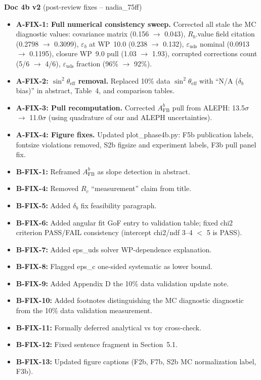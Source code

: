 \documentclass[11pt,a4paper]{article}
\begin{document}
\textbf{Doc 4b v2} (post-review fixes -- nadia\_75ff)
\begin{itemize}
\item \textbf{A-FIX-1: Full numerical consistency sweep.} Corrected all stale the MC diagnostic
  values: covariance matrix (0.156 $\to$ 0.043), $R_b$.value field citation (0.2798 $\to$ 0.3099),
  $\varepsilon_b$ at WP~10.0 (0.238 $\to$ 0.132), $\varepsilon_\mathrm{uds}$ nominal
  (0.0913 $\to$ 0.1195), closure WP~9.0 pull (1.03 $\to$ 1.93), corrupted corrections
  count (5/6 $\to$ 4/6), $\varepsilon_\mathrm{uds}$ fraction (96\% $\to$ 92\%).
\item \textbf{A-FIX-2: $\sin^2\theta_\mathrm{eff}$ removal.} Replaced 10\% data
  $\sin^2\theta_\mathrm{eff}$ with ``N/A ($\delta_b$ bias)'' in abstract, Table~4,
  and comparison tables.
\item \textbf{A-FIX-3: Pull recomputation.} Corrected $A_\mathrm{FB}^b$ pull from ALEPH:
  13.5$\sigma$ $\to$ 11.0$\sigma$ (using quadrature of our and ALEPH uncertainties).
\item \textbf{A-FIX-4: Figure fixes.} Updated plot\_phase4b.py: F5b publication labels,
  fontsize violations removed, S2b figsize and experiment labels, F3b pull panel fix.
\item \textbf{B-FIX-1:} Reframed $A_\mathrm{FB}^b$ as slope detection in abstract.
\item \textbf{B-FIX-4:} Removed $R_c$ ``measurement'' claim from title.
\item \textbf{B-FIX-5:} Added $\delta_b$ fix feasibility paragraph.
\item \textbf{B-FIX-6:} Added angular fit GoF entry to validation table; fixed chi2
  criterion PASS/FAIL consistency (intercept chi2/ndf 3--4 $<$ 5 is PASS).
\item \textbf{B-FIX-7:} Added eps\_uds solver WP-dependence explanation.
\item \textbf{B-FIX-8:} Flagged eps\_c one-sided systematic as lower bound.
\item \textbf{B-FIX-9:} Added Appendix D the 10\% data validation update note.
\item \textbf{B-FIX-10:} Added footnotes distinguishing the MC diagnostic diagnostic from the 10\% data validation measurement.
\item \textbf{B-FIX-11:} Formally deferred analytical vs toy cross-check.
\item \textbf{B-FIX-12:} Fixed sentence fragment in Section~5.1.
\item \textbf{B-FIX-13:} Updated figure captions (F2b, F7b, S2b MC normalization label, F3b).
\end{itemize}
\end{document}
